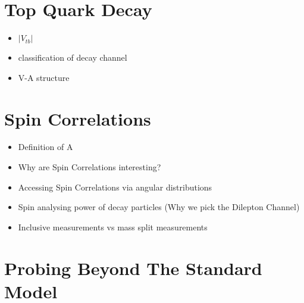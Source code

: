 \section{Top Quark Decay}

\begin{itemize}
  \item $|V_{tb}|$
  \item classification of decay channel
  \item V-A structure
\end{itemize}

\section{Spin Correlations}

\begin{itemize}
  \item Definition of A
  \item Why are Spin Correlations interesting?
  \item Accessing Spin Correlations via angular distributions
  \item Spin analysing power of decay particles (Why we pick the Dilepton Channel)
  \item Inclusive measurements vs mass split measurements
\end{itemize}


\section{Probing Beyond The Standard Model}




